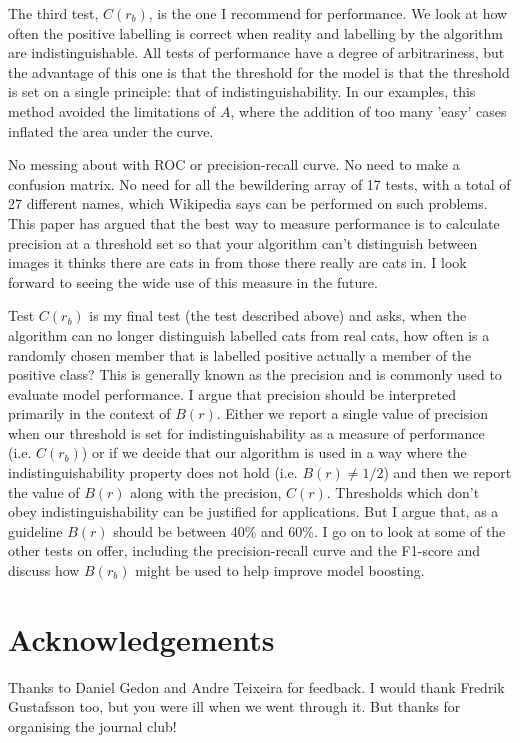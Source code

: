 \documentclass{article}
\begin{document}
The third test, $C(r_b)$, is the one I recommend for performance. We look at how often the positive labelling is correct when reality and labelling by the algorithm are indistinguishable. All tests of performance have a degree of arbitrariness, but the advantage of this one is that the threshold for the model is that the threshold is set on a single principle: that of indistinguishability. In our examples, this method avoided the limitations of $A$, where the addition of too many 'easy' cases inflated the area under the curve. 

No messing about with ROC or precision-recall curve. No need to make a confusion matrix. No need for all the bewildering array of 17 tests, with a total of 27 different names, which Wikipedia says can be performed on such problems. This paper has argued that the best way to measure performance is to calculate precision at a threshold set so that your algorithm can't distinguish between images it thinks there are cats in from those there really are cats in.  I look forward to seeing the wide use of this measure in the future. 

Test $C(r_b)$ is my final test (the test described above) and asks, when the algorithm can no longer distinguish labelled cats from real cats, how often is a randomly chosen member that is labelled positive actually a member of the positive class? This is generally known as the precision and is commonly used to evaluate model performance. I argue that precision should be interpreted primarily in the context of $B(r)$. Either we report a single value of precision when our threshold is set for indistinguishability as a measure of performance (i.e. $C(r_b)$) or if we decide that our algorithm is used in a way where the indistinguishability property does not hold (i.e. $B(r) \neq 1/2$) and then we report the value of $B(r)$ along with the precision, $C(r)$. Thresholds which don't obey indistinguishability can be justified for applications. But I argue that, as a guideline $B(r)$ should be between 40\% and 60\%.  I go on to look at some of the other tests on offer, including the precision-recall curve and the F1-score and discuss how $B(r_b)$ might be used to help improve model boosting. 

\section{Acknowledgements}

Thanks to Daniel Gedon and Andre Teixeira for feedback. I would thank Fredrik Gustafsson too, but you were ill when we went through it. But thanks for organising the journal club!
\end{document}

